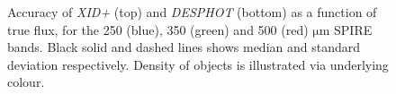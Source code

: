 \documentclass[useAMS,usenatbib]{mnras}
\begin{document}
\begin{figure}
\caption{Accuracy of \emph{XID+} (top) and \emph{DESPHOT} (bottom) as a function of true flux, for the 250 (blue), 350 (green) and 500 (red) $\mathrm{\mu m}$ SPIRE bands. Black solid and dashed lines shows median and standard deviation respectively. Density of objects is illustrated via underlying colour.}\label{fig:accuracy}
\end{figure}
\end{document}
